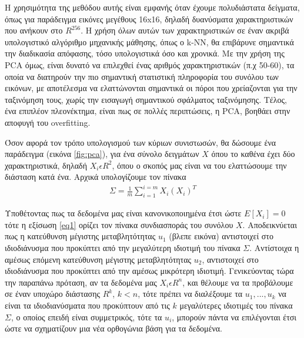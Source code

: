 \documentclass[11pt,a4paper,english,greek,twoside]{../Thesis}
\begin{document}
\par Η χρησιμότητα της μεθόδου αυτής είναι εμφανής όταν έχουμε πολυδιάστατα δείγματα, όπως για παράδειγμα εικόνες  μεγέθους 16x16, δηλαδή δυανύσματα χαρακτηριστικών που ανήκουν στο $R^{256}$. Η χρήση όλων αυτών των χαρακτηριστικών σε έναν ακριβά υπολογιστικό αλγόριθμο μηχανικής μάθησης, όπως ο k-NN, θα επιβάρυνε σημαντικά την διαδικασία απόφασης, τόσο υπολογιστικά όσο και χρονικά. Με την χρήση της PCA όμως, είναι δυνατό να επιλεχθεί ένας αριθμός χαρακτηριστικών (π.χ 50-60), τα οποία να διατηρούν την πιο σημαντική στατιστική πληροφορία του συνόλου των εικόνων, με αποτέλεσμα να ελαττώνονται σημαντικά οι πόροι που χρείαζονται για την ταξινόμηση τους, χωρίς την εισαγωγή σημαντικού σφάλματος ταξινόμησης. Τέλος, ένα επιπλέον πλεονέκτημα, είναι πως σε πολλές περιπτώσεις, η PCA, βοηθάει στην αποφυγή του overfitting.

\par Όσον αφορά τον τρόπο υπολογισμού των κύριων συνιστωσών, θα δώσουμε ένα παράδειγμα (εικόνα \ref{fig:pca}), για ένα σύνολο δειγμάτων $X$ όπου το καθένα έχει δύο χαρακτηριστικά, δηλαδή $X_i \epsilon R^2$, όπου ο σκοπός μας είναι να του ελαττώσουμε την διάσταση κατά ένα. Αρχικά υπολογίζουμε τον πίνακα 
\begin{align}
\Sigma = \frac{1}{m}\sum_{i=1}^{i=m} X_i(X_i)^T \label{eq1}
\end{align}

\par Υποθέτοντας πως τα δεδομένα μας είναι κανονικοποιημένα έτσι ώστε $E[X_i]=0$ τότε η εξίσωση \eqref{eq1} ορίζει τον πίνακα συνδιασποράς του συνόλου $X$. Αποδεικνύεται πως η κατεύθυνση μέγιστης μεταβλητότητας $u_1$ (βλεπε εικόνα) αντιστοιχεί στο ιδιοδιάνυσμα που προκύπτει από την μεγαλύτερη ιδιοτιμή του πίνακα $\Sigma$. Αντίστοιχα η αμέσως επόμενη κατεύθυνση μέγιστης μεταβλητότητας $u_2$, αντιστοιχεί στο ιδιοδιάνυσμα που προκύπτει από την αμέσως μικρότερη ιδιοτιμή. Γενικεύοντας τώρα την παραπάνω πρόταση, αν τα δεδομένα μας $X_i \epsilon R^n$, και θέλουμε να τα προβάλουμε σε έναν υποχώρο διάστασης $R^k$, $k<n$, τότε πρέπει να διαλέξουμε τα $u_1,...,u_k$ να είναι τα ιδιοδιανύσματα που προκύπτουν από τις $k$ μεγαλύτερες ιδιοτιμές του πίνακα $\Sigma$, ο οποίος επειδή είναι συμμετρικός, τότε τα $u_i$, μπορούν πάντα να επιλέγονται έτσι ώστε να σχηματίζουν μια νέα ορθογώνια βάση για τα δεδομένα.
\end{document}
